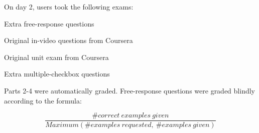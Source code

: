 \documentclass{sigchi}
\begin{document}
On day 2, users took the following exams:

\begin{compactenum}
\item Extra free-response questions %
\item Original in-video questions from Coursera%
\item Original unit exam from Coursera%
\item Extra multiple-checkbox questions %
\end{compactenum}


Parts 2-4 were automatically graded. Free-response questions were graded blindly according to the formula:

\vspace{-4mm}

\[ \frac{\# correct\ examples\ given}{Maximum(\# examples\ requested,\ \# examples\ given)} \]


\end{document}
